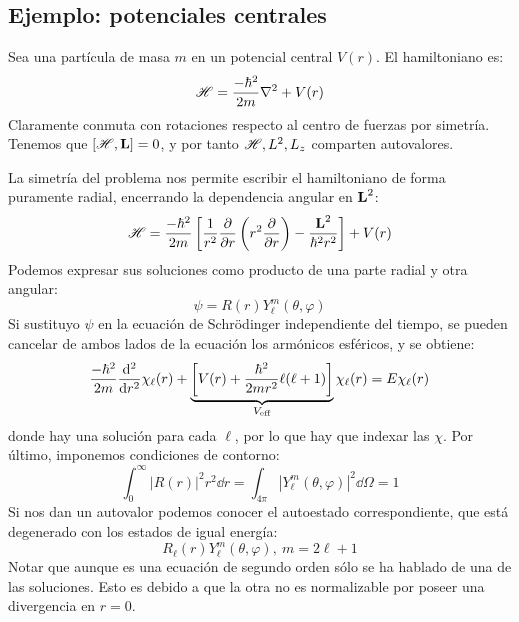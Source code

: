 \subsection{Ejemplo: potenciales centrales}
Sea una partícula de masa $m$ en un potencial central $V(r)$. El
hamiltoniano es:
\begin{equation}
   \mathscr{H}  = \frac{-\hbar^2}{2m}\nabla^2 + V(r)
\end{equation}
Claramente conmuta con rotaciones respecto al centro de fuerzas por
simetría. Tenemos que $[ \mathscr{H} ,\bm{\mathrm{L}}] = 0$, y por tanto
$ \mathscr{H} ,L^2,L_z$ comparten autovalores.

La simetría del problema nos permite escribir el hamiltoniano de
forma puramente radial, encerrando la dependencia angular en $\bm{\mathrm{L}}^2$:
\begin{equation}
   \mathscr{H}  = \frac{-\hbar^2}{2m} \left[ \frac{1}{r^2} \pdv{}{r}
    \left( r^2 \pdv{}{r} \right) - \frac{\bm{\mathrm{L}}^2}{\hbar^2 r^2} \right] + V(r)
\end{equation}
Podemos expresar sus soluciones como producto de una parte radial y
otra angular:
\begin{equation}
  \psi = R(r) Y_\ell^m(\theta,\varphi)
\end{equation}
Si sustituyo $\psi$ en la ecuación de Schrödinger independiente del
tiempo, se pueden cancelar de ambos lados de la ecuación los armónicos
esféricos, y se obtiene:
\begin{equation}
  \frac{-\hbar^2}{2m} \dv[2]{}{r} \chi_\ell(r) + \underbrace{\left[ V(r) +
    \frac{\hbar^2}{2mr^2} \ell (\ell+1) \right]}_{V_\text{eff}} \chi_\ell(r) = E \chi_\ell(r)
\end{equation}
donde hay una solución para cada $\ell$, por lo que hay que indexar las
$\chi$. Por último, imponemos condiciones de contorno:
\begin{equation}
  \int_{0}^\infty |R(r)|^2 r^2 \dd{r} = \int_{4\pi}
  |Y_\ell^m(\theta,\varphi)|^2 \dd{\Omega} = 1
\end{equation}
Si nos dan un autovalor podemos conocer el autoestado correspondiente,
que está degenerado con los estados de igual energía:
\begin{equation}
  R_\ell(r)Y_\ell^m(\theta,\varphi), \ m = 2\ell+1
\end{equation}
Notar que aunque es una ecuación de segundo orden sólo se ha hablado
de una de las soluciones. Esto es debido a que la otra no es
normalizable por poseer una divergencia en $r=0$.

